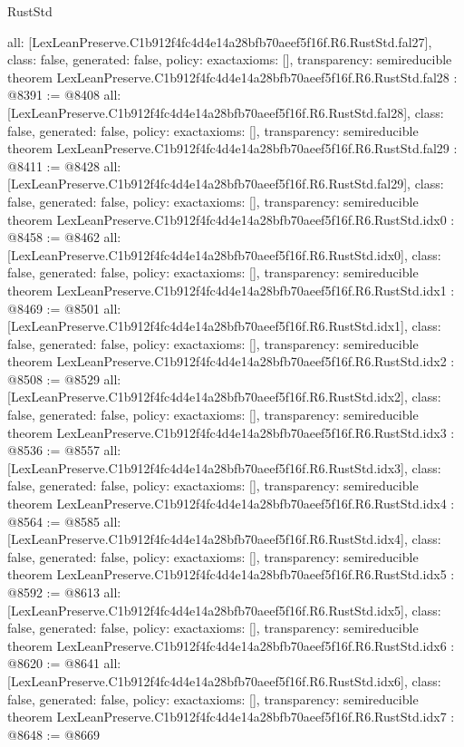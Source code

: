 \begin{lexlean}{RustStd}
\begin{coremodule}
{  all: [LexLeanPreserve.C1b912f4fc4d4e14a28bfb70aeef5f16f.R6.RustStd.fal27],
  class: false,
  generated: false,
  policy: exact{axioms: []},
  transparency: semireducible
}
theorem LexLeanPreserve.C1b912f4fc4d4e14a28bfb70aeef5f16f.R6.RustStd.fal28 : @8391 := @8408 {
  all: [LexLeanPreserve.C1b912f4fc4d4e14a28bfb70aeef5f16f.R6.RustStd.fal28],
  class: false,
  generated: false,
  policy: exact{axioms: []},
  transparency: semireducible
}
theorem LexLeanPreserve.C1b912f4fc4d4e14a28bfb70aeef5f16f.R6.RustStd.fal29 : @8411 := @8428 {
  all: [LexLeanPreserve.C1b912f4fc4d4e14a28bfb70aeef5f16f.R6.RustStd.fal29],
  class: false,
  generated: false,
  policy: exact{axioms: []},
  transparency: semireducible
}
theorem LexLeanPreserve.C1b912f4fc4d4e14a28bfb70aeef5f16f.R6.RustStd.idx0 : @8458 := @8462 {
  all: [LexLeanPreserve.C1b912f4fc4d4e14a28bfb70aeef5f16f.R6.RustStd.idx0],
  class: false,
  generated: false,
  policy: exact{axioms: []},
  transparency: semireducible
}
theorem LexLeanPreserve.C1b912f4fc4d4e14a28bfb70aeef5f16f.R6.RustStd.idx1 : @8469 := @8501 {
  all: [LexLeanPreserve.C1b912f4fc4d4e14a28bfb70aeef5f16f.R6.RustStd.idx1],
  class: false,
  generated: false,
  policy: exact{axioms: []},
  transparency: semireducible
}
theorem LexLeanPreserve.C1b912f4fc4d4e14a28bfb70aeef5f16f.R6.RustStd.idx2 : @8508 := @8529 {
  all: [LexLeanPreserve.C1b912f4fc4d4e14a28bfb70aeef5f16f.R6.RustStd.idx2],
  class: false,
  generated: false,
  policy: exact{axioms: []},
  transparency: semireducible
}
theorem LexLeanPreserve.C1b912f4fc4d4e14a28bfb70aeef5f16f.R6.RustStd.idx3 : @8536 := @8557 {
  all: [LexLeanPreserve.C1b912f4fc4d4e14a28bfb70aeef5f16f.R6.RustStd.idx3],
  class: false,
  generated: false,
  policy: exact{axioms: []},
  transparency: semireducible
}
theorem LexLeanPreserve.C1b912f4fc4d4e14a28bfb70aeef5f16f.R6.RustStd.idx4 : @8564 := @8585 {
  all: [LexLeanPreserve.C1b912f4fc4d4e14a28bfb70aeef5f16f.R6.RustStd.idx4],
  class: false,
  generated: false,
  policy: exact{axioms: []},
  transparency: semireducible
}
theorem LexLeanPreserve.C1b912f4fc4d4e14a28bfb70aeef5f16f.R6.RustStd.idx5 : @8592 := @8613 {
  all: [LexLeanPreserve.C1b912f4fc4d4e14a28bfb70aeef5f16f.R6.RustStd.idx5],
  class: false,
  generated: false,
  policy: exact{axioms: []},
  transparency: semireducible
}
theorem LexLeanPreserve.C1b912f4fc4d4e14a28bfb70aeef5f16f.R6.RustStd.idx6 : @8620 := @8641 {
  all: [LexLeanPreserve.C1b912f4fc4d4e14a28bfb70aeef5f16f.R6.RustStd.idx6],
  class: false,
  generated: false,
  policy: exact{axioms: []},
  transparency: semireducible
}
theorem LexLeanPreserve.C1b912f4fc4d4e14a28bfb70aeef5f16f.R6.RustStd.idx7 : @8648 := @8669 {
}
\end{coremodule}
\end{lexlean}
